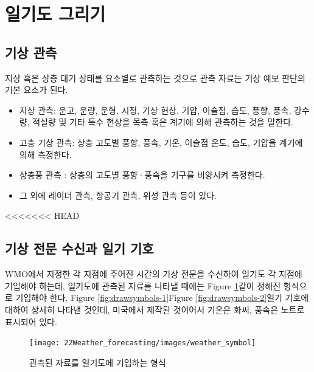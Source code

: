 \newpage
\section{일기도 그리기}

\subsection{기상 관측}
지상 혹은 상층 대기 상태를 요소별로 관측하는 것으로 관측 자료는 기상 예보 판단의 기본 요소가 된다.

\begin{itemize}
	\item 지상 관측: 운고, 운량, 운형, 시정, 기상 현상, 기압, 이슬점, 습도, 풍향, 풍속, 강수량, 적설량 및 기타 특수 현상을 목측 혹은 계기에 의해 관측하는 것을 말한다.
	\item 고층 기상 관측: 상층 고도별 풍향, 풍속, 기온, 이슬점 온도, 습도, 기압을 계기에 의해 측정한다.
	\item 상층풍 관측 : 상층의 고도별 풍향·풍속을 기구를 비양시켜 측정한다.
	\item 그 외에 레이더 관측, 항공기 관측, 위성 관측 등이 있다.
\end{itemize}


<<<<<<< HEAD
\subsection{기상 전문 수신과 일기 기호}

WMO에서 지정한 각 지점에 주어진 시간의 기상 전문을 수신하여 일기도 각 지점에 기입해야 하는데, 일기도에 관측된 자료를 나타낼 때에는 Figure \ref{fig:weathersymbol}\과 같이 정해진 형식으로 기입해야 한다. Figure \ref{fig:drawsymbols-1}\과 Figure \ref{fig:drawsymbols-2}\는 일기 기호에 대하여 상세히 나타낸 것인데, 미국에서 제작된 것이어서 기온은 화씨, 풍속은 노트로 표시되어 있다.

\begin{figure}[h]
	\centering
	\texttt{[image: 22Weather\_forecasting/images/weather\_symbol]}
	\caption{관측된 자료를 일기도에 기입하는 형식}
	\label{fig:weathersymbol}
\end{figure}

